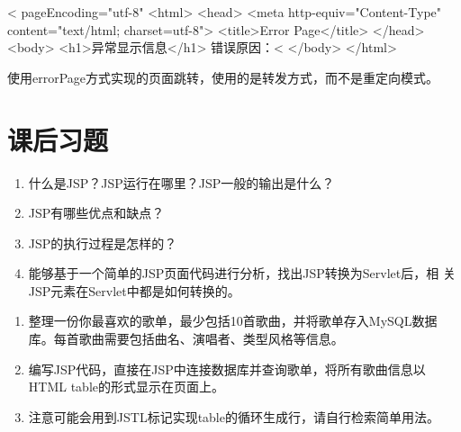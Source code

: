 
\begin{jspCode}
  <%
    pageEncoding="utf-8"%
  <html>
    <head>
      <meta http-equiv="Content-Type" content="text/html; charset=utf-8">
      <title>Error Page</title>
    </head>
    <body>
      <h1>异常显示信息</h1>
      错误原因：<%
    </body>
  </html>  
\end{jspCode}

{\kai\Red 使用errorPage方式实现的页面跳转，使用的是转发方式，而不是重定向模式。}




\section{课后习题}


\begin{enumerate}
\item 什么是JSP？JSP运行在哪里？JSP一般的输出是什么？
\item JSP有哪些优点和缺点？
\item JSP的执行过程是怎样的？
\item 能够基于一个简单的JSP页面代码进行分析，找出JSP转换为Servlet后，相
  关JSP元素在Servlet中都是如何转换的。
\end{enumerate}


\begin{enumerate}
\item 整理一份你最喜欢的歌单，最少包括10首歌曲，并将歌单存入MySQL数据库。每首歌曲需要包括曲名、演唱者、类型风格等信息。
\item 编写JSP代码，直接在JSP中连接数据库并查询歌单，将所有歌曲信息以HTML table的形式显示在页面上。
\item 注意可能会用到JSTL标记实现table的循环生成行，请自行检索简单用法。
\end{enumerate}
